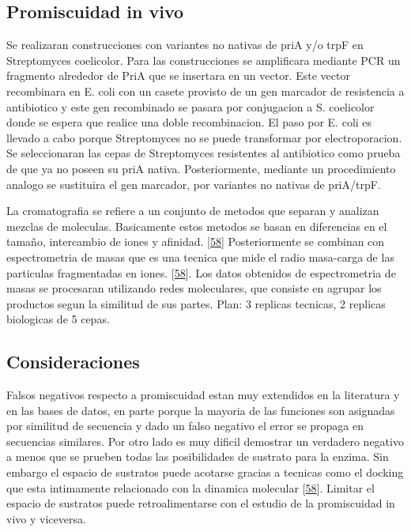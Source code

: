 \documentclass[12pt,twoside]{reedthesis}
\begin{document}
  \subsection{Promiscuidad in vivo}\label{promiscuidad-in-vivo}
  
  Se realizaran construcciones con variantes no nativas de priA y/o trpF
  en Streptomyces coelicolor. Para las construcciones se amplificara
  mediante PCR un fragmento alrededor de PriA que se insertara en un
  vector. Este vector recombinara en E. coli con un casete provisto de un
  gen marcador de resistencia a antibiotico y este gen recombinado se
  pasara por conjugacion a S. coelicolor donde se espera que realice una
  doble recombinacion. El paso por E. coli es llevado a cabo porque
  Streptomyces no se puede transformar por electroporacion. Se
  seleccionaran las cepas de Streptomyces resistentes al antibiotico como
  prueba de que ya no poseen su priA nativa. Posteriormente, mediante un
  procedimiento analogo se sustituira el gen marcador, por variantes no
  nativas de priA/trpF.
  
  La cromatografia se refiere a un conjunto de metodos que separan y
  analizan mezclas de moleculas. Basicamente estos metodos se basan en
  diferencias en el tamaño, intercambio de iones y afinidad.
  {[}\protect\hyperlink{ref-campbellux5fbiophysicalux5f2012}{58}{]}
  Posteriormente se combinan con espectrometria de masas que es una
  tecnica que mide el radio masa-carga de las particulas fragmentadas en
  iones.
  {[}\protect\hyperlink{ref-campbellux5fbiophysicalux5f2012}{58}{]}. Los
  datos obtenidos de espectrometria de masas se procesaran utilizando
  redes moleculares, que consiste en agrupar los productos segun la
  similitud de sus partes. Plan: 3 replicas tecnicas, 2 replicas
  biologicas de 5 cepas.
  
  \subsection{Consideraciones}\label{consideraciones}
  
  Falsos negativos respecto a promiscuidad estan muy extendidos en la
  literatura y en las bases de datos, en parte porque la mayoria de las
  funciones son asignadas por similitud de secuencia y dado un falso
  negativo el error se propaga en secuencias similares. Por otro lado es
  muy dificil demostrar un verdadero negativo a menos que se prueben todas
  las posibilidades de sustrato para la enzima. Sin embargo el espacio de
  sustratos puede acotarse gracias a tecnicas como el docking que esta
  intimamente relacionado con la dinamica molecular
  {[}\protect\hyperlink{ref-campbellux5fbiophysicalux5f2012}{58}{]}.
  Limitar el espacio de sustratos puede retroalimentarse con el estudio de
  la promiscuidad in vivo y viceversa.
  
\end{document}
